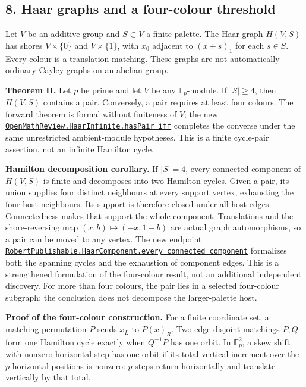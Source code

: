 \documentclass[
  11pt,
]{article}
\begin{document}
\subsection{8. Haar graphs and a four-colour
threshold}\label{haar-graphs-and-a-four-colour-threshold}

Let \(V\) be an additive group and \(S\subset V\) a finite palette. The
Haar graph \(H(V,S)\) has shores \(V\times\{0\}\) and \(V\times\{1\}\),
with \(x_0\) adjacent to \((x+s)_1\) for each \(s\in S\). Every colour
is a translation matching. These graphs are not automatically ordinary
Cayley graphs on an abelian group.

\textbf{Theorem H.} Let \(p\) be prime and let \(V\) be any
\(\mathbb F_p\)-module. If \(|S|\geq4\), then \(H(V,S)\) contains a
pair. Conversely, a pair requires at least four colours. The forward
theorem is formal without finiteness of \(V\); the new
\href{https://github.com/alejandrozu/openmath-2026-judging/blob/70c5ec3107658182f22c207d4c50f53f9cb3e602/robert-review-2026-10-07/lean/HaarInfinite.lean\#L110}{\texttt{OpenMathReview.HaarInfinite.hasPair\_iff}}
completes the converse under the same unrestricted ambient-module
hypotheses. This is a finite cycle-pair assertion, not an infinite
Hamilton cycle.

\textbf{Hamilton decomposition corollary.} If \(|S|=4\), every connected
component of \(H(V,S)\) is finite and decomposes into two Hamilton
cycles. Given a pair, its union supplies four distinct neighbours at
every support vertex, exhausting the four host neighbours. Its support
is therefore closed under all host edges. Connectedness makes that
support the whole component. Translations and the shore-reversing map
\((x,b)\mapsto(-x,1-b)\) are actual graph automorphisms, so a pair can
be moved to any vertex. The new endpoint
\href{https://github.com/alejandrozu/openmath-2026-judging/blob/70c5ec3107658182f22c207d4c50f53f9cb3e602/robert-review-2026-10-07/lean/HaarComponents.lean\#L73}{\texttt{RobertPublishable.HaarComponent.every\_connected\_component}}
formalizes both the spanning cycles and the exhaustion of component
edges. This is a strengthened formulation of the four-colour result, not
an additional independent discovery. For more than four colours, the
pair lies in a selected four-colour subgraph; the conclusion does not
decompose the larger-palette host.

\textbf{Proof of the four-colour construction.} For a finite coordinate
set, a matching permutation \(P\) sends \(x_L\) to \(P(x)_R\). Two
edge-disjoint matchings \(P,Q\) form one Hamilton cycle exactly when
\(Q^{-1}P\) has one orbit. In \(\mathbb F_p^2\), a skew shift with
nonzero horizontal step has one orbit if its total vertical increment
over the \(p\) horizontal positions is nonzero: \(p\) steps return
horizontally and translate vertically by that total.
\end{document}

